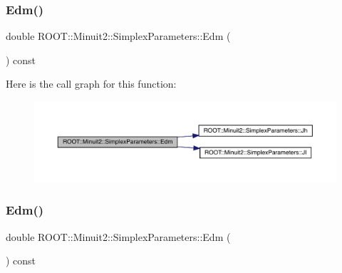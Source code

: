 \subsubsection{\texorpdfstring{Edm()}{Edm()}\hspace{0.1cm}{\footnotesize\ttfamily [1/2]}}
{\footnotesize\ttfamily double R\+O\+O\+T\+::\+Minuit2\+::\+Simplex\+Parameters\+::\+Edm (\begin{DoxyParamCaption}{ }\end{DoxyParamCaption}) const\hspace{0.3cm}{\ttfamily [inline]}}

Here is the call graph for this function\+:
\nopagebreak
\begin{figure}[H]
\begin{center}
\leavevmode
\includegraphics[width=350pt]{d7/da2/classROOT_1_1Minuit2_1_1SimplexParameters_ad71f372dd3873cbf351dc8eddc3a9c9a_cgraph}
\end{center}
\end{figure}
\mbox{\label{classROOT_1_1Minuit2_1_1SimplexParameters_ad71f372dd3873cbf351dc8eddc3a9c9a}} 
\subsubsection{\texorpdfstring{Edm()}{Edm()}\hspace{0.1cm}{\footnotesize\ttfamily [2/2]}}
{\footnotesize\ttfamily double R\+O\+O\+T\+::\+Minuit2\+::\+Simplex\+Parameters\+::\+Edm (\begin{DoxyParamCaption}{ }\end{DoxyParamCaption}) const\hspace{0.3cm}{\ttfamily [inline]}}

